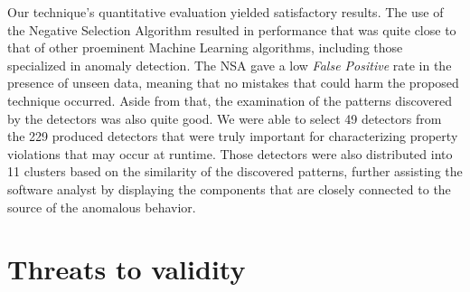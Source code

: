 Our technique's quantitative evaluation yielded satisfactory results. The use of the Negative Selection Algorithm resulted in performance that was quite close to that of other proeminent Machine Learning algorithms, including those specialized in anomaly detection. The NSA gave a low \textit{False Positive} rate in the presence of unseen data, meaning that no mistakes that could harm the proposed technique occurred. Aside from that, the examination of the patterns discovered by the detectors was also quite good. We were able to select 49 detectors from the 229 produced detectors that were truly important for characterizing property violations that may occur at runtime. Those detectors were also distributed into 11 clusters based on the similarity of the discovered patterns, further assisting the software analyst by displaying the components that are closely connected to the source of the anomalous behavior.


\section{Threats to validity}

